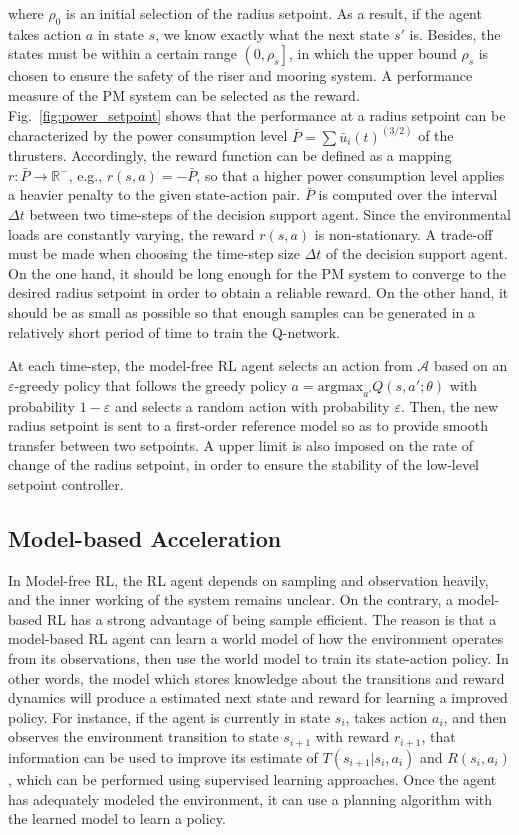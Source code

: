 \begin{sloppypar}
\noindent where $\rho_0$ is an initial selection of the radius setpoint. As a result, if the agent takes action $a$ in state $s$, we know exactly what the next state $s'$ is. Besides, the states must be within a certain range $\left(0, \rho_s\right]$, in which the upper bound $\rho_s$ is chosen to ensure the safety of the riser and mooring system. A performance measure of the PM system can be selected as the reward. Fig.~\ref{fig:power_setpoint} shows that the performance at a radius setpoint can be characterized by the power consumption level $\bar{P} = \sum \bar{u}_i(t)^{(3/2)}$ of the thrusters. Accordingly, the reward function can be defined as a mapping $r:\bar{P} \to \mathbb{R}^-$, e.g., $r(s, a) = -\bar{P}$, so that a higher power consumption level applies a heavier penalty to the given state-action pair. $\bar{P}$ is computed over the interval $\Delta t$ between two time-steps of the decision support agent. Since the environmental loads are constantly varying, the reward $r(s,a)$ is non-stationary. A trade-off must be made when choosing the time-step size $\Delta t$ of the decision support agent. On the one hand, it should be long enough for the PM system to converge to the desired radius setpoint in order to obtain a reliable reward. On the other hand, it should be as small as possible so that enough samples can be generated in a relatively short period of time to train the Q-network.

At each time-step, the model-free RL agent selects an action from $\mathcal{A}$ based on an $\varepsilon$-greedy policy that follows the greedy policy $a = \mathrm{argmax}_{a'}Q(s,a';\theta)$ with probability $1-\varepsilon$ and selects a random action with probability $\varepsilon$. Then, the new radius setpoint is sent to a first-order reference model so as to provide smooth transfer between two setpoints. A upper limit is also imposed on the rate of change of the radius setpoint, in order to ensure the stability of the low-level setpoint controller. 

\subsection{Model-based Acceleration}
In Model-free RL, the RL agent depends on sampling and observation heavily, and the inner working of the system remains unclear. On the contrary, a model-based RL has a strong advantage of being sample efficient. The reason is that a model-based RL agent can learn a world model of how the environment operates from its observations, then use the world model to train its state-action policy. In other words, the model which stores knowledge about the transitions and reward dynamics will produce a estimated next state and reward for learning a improved policy. For instance, if the agent is currently in state $s_i$, takes action $a_i$, and then observes the environment transition to state $s_{i+1}$ with reward $r_{i+1}$, that information can be used to improve its estimate of $T(s_{i+1}|s_i,a_i)$ and $R(s_i, a_i)$, which can be performed using supervised learning approaches. Once the agent has adequately modeled the environment, it can use a planning algorithm with the learned model to learn a policy\cite{silver2008sample}.


\end{sloppypar}
